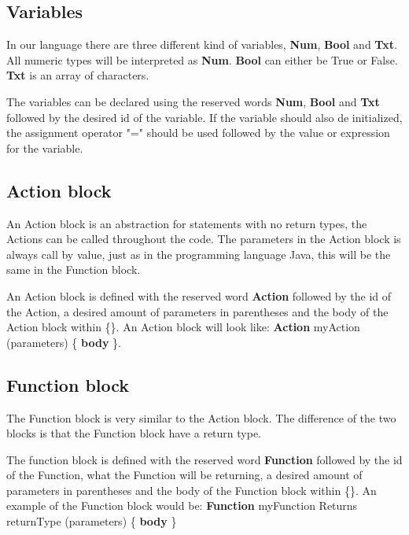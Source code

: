\subsection{Variables}
In our language there are three different kind of variables, \textbf{Num}, \textbf{Bool} and \textbf{Txt}. All numeric types will be interpreted as \textbf{Num}. \textbf{Bool} can either be True or False. \textbf{Txt} is an array of characters.

\begin{defi}
The variables can be declared using the reserved words \textbf{Num}, \textbf{Bool} and \textbf{Txt} followed by the desired id of the variable. If the variable should also de initialized,  the assignment operator "=" should be used followed by the value or expression for the variable. 
\end{defi}

\subsection{Action block}
An Action block is an abstraction for statements with no return types, the Actions can be called throughout the code. The parameters in the Action block is always call by value, just as in the programming language Java, this will be the same in the Function block.

\begin{defi}
An Action block is defined with the reserved word \textbf{Action} followed by the id of the Action, a desired amount of parameters in parentheses and the body of the Action block within \{\}.
An Action block will look like: \textbf{Action} myAction (parameters) \{ \textbf{body} \}.
\end{defi}

\subsection{Function block}
The Function block is very similar to the Action block. The difference of the two blocks is that the Function block have a return type. 

\begin{defi}
The function block is defined with the reserved word \textbf{Function} followed by the id of the Function, what the Function will be returning, a desired amount of parameters in parentheses and the body of the Function block within \{\}.
An example of the Function block would be: \textbf{Function} myFunction Returns returnType (parameters) \{ \textbf{body} \}
\end{defi}


